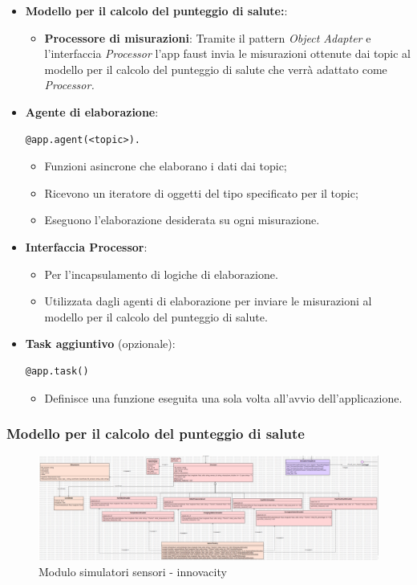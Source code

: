 \begin{itemize}
\begin{itemize}
    \end{itemize}
    \item \textbf{Modello per il calcolo del punteggio di salute:}:
    \begin{itemize}
        \item \textbf{Processore di misurazioni}: 
        Tramite il pattern \textit{Object Adapter} e l'interfaccia \textit{Processor} l'app faust invia le misurazioni ottenute dai topic al modello per il calcolo del punteggio di salute che verrà adattato come \textit{Processor.}
    \end{itemize}
    \item \textbf{Agente di elaborazione}: 
    \begin{lstlisting}[style=code]
        @app.agent(<topic>).
    \end{lstlisting}  
    \begin{itemize}
        \item Funzioni asincrone che elaborano i dati dai topic;
        \item Ricevono un iteratore di oggetti del tipo specificato per il topic;
        \item Eseguono l'elaborazione desiderata su ogni misurazione.
    \end{itemize}
    \item \textbf{Interfaccia Processor}:
    \begin{itemize}
        \item Per l'incapsulamento di logiche di elaborazione.
        \item Utilizzata dagli agenti di elaborazione per inviare le misurazioni al modello per il calcolo del punteggio di salute.
    \end{itemize}
    \item \textbf{Task aggiuntivo} (opzionale): 
    \begin{lstlisting}[style=code]
    @app.task()
        \end{lstlisting}  
    \begin{itemize}
        \item Definisce una funzione eseguita una sola volta all'avvio dell'applicazione.
    \end{itemize}
\end{itemize}

\subsubsection{Modello per il calcolo del punteggio di salute}
\begin{figure}[H]
    \centering
    \includegraphics[width=1\textwidth]{../Images/SpecificaTecnica/simulatoriSensori.PNG}
    \caption{Modulo simulatori sensori - innovacity}
    \label{fig: fddf}
\end{figure}

